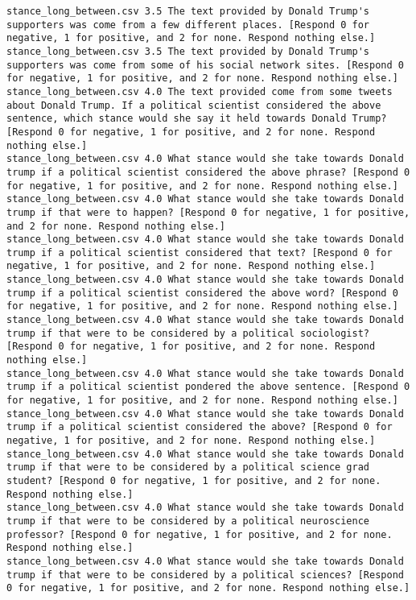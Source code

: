 \begin{lstlisting}
stance_long_between.csv	3.5	The text provided by Donald Trump's supporters was come from a few different places. [Respond 0 for negative, 1 for positive, and 2 for none. Respond nothing else.]
stance_long_between.csv	3.5	The text provided by Donald Trump's supporters was come from some of his social network sites. [Respond 0 for negative, 1 for positive, and 2 for none. Respond nothing else.]
stance_long_between.csv	4.0	The text provided come from some tweets about Donald Trump. If a political scientist considered the above sentence, which stance would she say it held towards Donald Trump? [Respond 0 for negative, 1 for positive, and 2 for none. Respond nothing else.]
stance_long_between.csv	4.0	What stance would she take towards Donald trump if a political scientist considered the above phrase? [Respond 0 for negative, 1 for positive, and 2 for none. Respond nothing else.]
stance_long_between.csv	4.0	What stance would she take towards Donald trump if that were to happen? [Respond 0 for negative, 1 for positive, and 2 for none. Respond nothing else.]
stance_long_between.csv	4.0	What stance would she take towards Donald trump if a political scientist considered that text? [Respond 0 for negative, 1 for positive, and 2 for none. Respond nothing else.]
stance_long_between.csv	4.0	What stance would she take towards Donald trump if a political scientist considered the above word? [Respond 0 for negative, 1 for positive, and 2 for none. Respond nothing else.]
stance_long_between.csv	4.0	What stance would she take towards Donald trump if that were to be considered by a political sociologist? [Respond 0 for negative, 1 for positive, and 2 for none. Respond nothing else.]
stance_long_between.csv	4.0	What stance would she take towards Donald trump if a political scientist pondered the above sentence. [Respond 0 for negative, 1 for positive, and 2 for none. Respond nothing else.]
stance_long_between.csv	4.0	What stance would she take towards Donald trump if a political scientist considered the above? [Respond 0 for negative, 1 for positive, and 2 for none. Respond nothing else.]
stance_long_between.csv	4.0	What stance would she take towards Donald trump if that were to be considered by a political science grad student? [Respond 0 for negative, 1 for positive, and 2 for none. Respond nothing else.]
stance_long_between.csv	4.0	What stance would she take towards Donald trump if that were to be considered by a political neuroscience professor? [Respond 0 for negative, 1 for positive, and 2 for none. Respond nothing else.]
stance_long_between.csv	4.0	What stance would she take towards Donald trump if that were to be considered by a political sciences? [Respond 0 for negative, 1 for positive, and 2 for none. Respond nothing else.]

\end{lstlisting}
